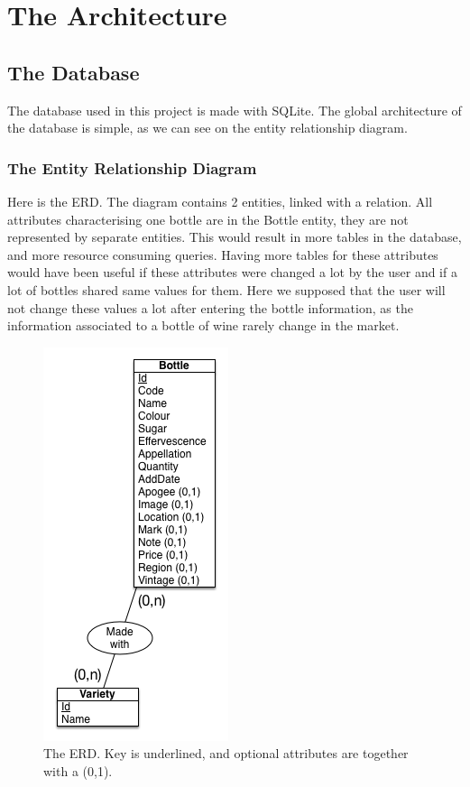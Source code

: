 \section{The Architecture}

\subsection{The Database}

The database used in this project is made with SQLite. The global architecture of the database is simple, as we can see on the entity relationship diagram.

\subsubsection{The Entity Relationship Diagram}

Here is the ERD. The diagram contains 2 entities, linked with a relation. All attributes characterising one bottle are in the Bottle entity, they are not represented by separate entities. This would result in more tables in the database, and more resource consuming queries. Having more tables for these attributes would have been useful if these attributes were changed a lot by the user and if a lot of bottles shared same values for them. Here we supposed that the user will not change these values a lot after entering the bottle information, as the information associated to a bottle of wine rarely change in the market.

\begin{figure}[H]
\begin{center}
	\includegraphics[scale=0.7]{../Entity Relationship DB diagram.png}
	\caption{The ERD. Key is underlined, and optional attributes are together with a (0,1).}
\end{center}
\end{figure}

